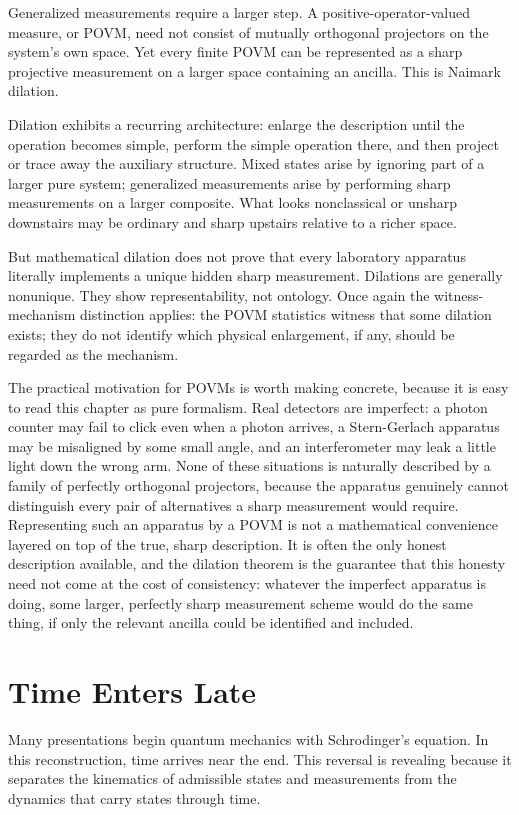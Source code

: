 \documentclass[12pt,openany]{book}
\begin{document}
Generalized measurements require a larger step. A positive-operator-valued measure, or POVM, need not consist of mutually orthogonal projectors on the system's own space. Yet every finite POVM can be represented as a sharp projective measurement on a larger space containing an ancilla. This is Naimark dilation.

Dilation exhibits a recurring architecture: enlarge the description until the operation becomes simple, perform the simple operation there, and then project or trace away the auxiliary structure. Mixed states arise by ignoring part of a larger pure system; generalized measurements arise by performing sharp measurements on a larger composite. What looks nonclassical or unsharp downstairs may be ordinary and sharp upstairs relative to a richer space.

But mathematical dilation does not prove that every laboratory apparatus literally implements a unique hidden sharp measurement. Dilations are generally nonunique. They show representability, not ontology. Once again the witness-mechanism distinction applies: the POVM statistics witness that some dilation exists; they do not identify which physical enlargement, if any, should be regarded as the mechanism.

The practical motivation for POVMs is worth making concrete, because it is easy to read this chapter as pure formalism. Real detectors are imperfect: a photon counter may fail to click even when a photon arrives, a Stern-Gerlach apparatus may be misaligned by some small angle, and an interferometer may leak a little light down the wrong arm. None of these situations is naturally described by a family of perfectly orthogonal projectors, because the apparatus genuinely cannot distinguish every pair of alternatives a sharp measurement would require. Representing such an apparatus by a POVM is not a mathematical convenience layered on top of the true, sharp description. It is often the only honest description available, and the dilation theorem is the guarantee that this honesty need not come at the cost of consistency: whatever the imperfect apparatus is doing, some larger, perfectly sharp measurement scheme would do the same thing, if only the relevant ancilla could be identified and included.

\chapter{Time Enters Late}
Many presentations begin quantum mechanics with Schrodinger's equation. In this reconstruction, time arrives near the end. This reversal is revealing because it separates the kinematics of admissible states and measurements from the dynamics that carry states through time.
\end{document}
